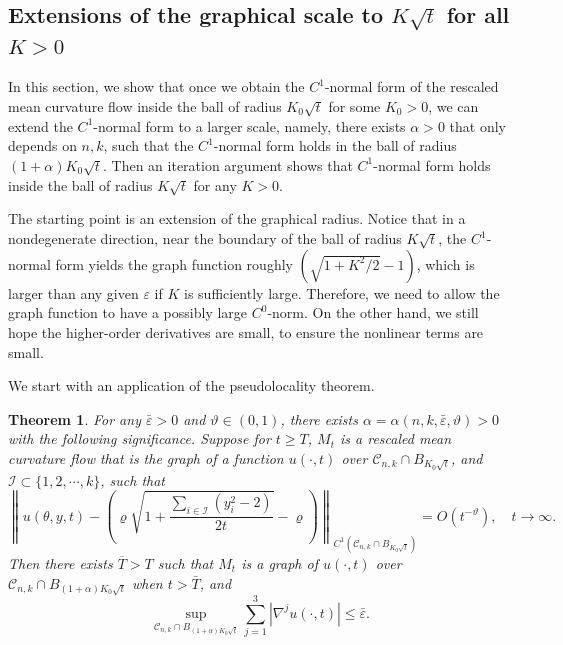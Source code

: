 \documentclass[11pt]{amsart}
\numberwithin{equation}{section}
\newtheorem{theorem}{Theorem}[section]
\numberwithin{equation}{section}
\newcommand{\eps}{\varepsilon}
\newcommand{\cC}{\mathcal{C}}
\begin{document}
	
	\subsection{Extensions of the graphical scale to $K\sqrt{t}$ for all $K>0$}
	In this section, we show that once we obtain the $C^1$-normal form of the rescaled mean curvature flow inside the ball of radius $K_0\sqrt{t}$ for some $K_0>0$, we can extend the $C^1$-normal form to a larger scale, namely, there exists $\alpha>0$ that only depends on $n,k$, such that the $C^1$-normal form holds in the ball of radius $(1+\alpha)K_0\sqrt{t}$. Then an iteration argument shows that $C^1$-normal form holds inside the ball of radius $K\sqrt{t}$ for any $K>0$.
	
	
	
	The starting point is an extension of the graphical radius. Notice that in a nondegenerate direction, near the boundary of the ball of radius $K\sqrt{t}$, the $C^1$-normal form yields the graph function roughly $(\sqrt{1+K^2/2}-1)$, which is larger than any given $\eps$ if $K$ is sufficiently large. Therefore, we need to allow the graph function to have a possibly large $C^0$-norm. On the other hand, we still hope the higher-order derivatives are small, to ensure the nonlinear terms are small.
	
	We start with an application of the pseudolocality theorem.
	
	\begin{theorem}\label{thm:K0sqrt t to K sqrt t}
		For any $\bar \eps>0$ and $\vartheta\in(0,1)$, there exists $\alpha=\alpha(n,k,\bar \eps,\vartheta)>0$ with the following significance. Suppose for $t\geq T$, $M_t$ is a rescaled mean curvature flow that is the graph of a function $u(\cdot,t)$ over $ \cC_{n,k}\cap B_{K_0\sqrt{t}}$, and $\mathcal I\subset\{1,2,\cdots,k\}$, such that 
		\[
		\left\| u(\theta,y,t)-\left(\varrho\sqrt{1+\frac{\sum_{i\in\mathcal I}(y_i^2-2)}{2t}}-\varrho\right)
		\right\|_{C^1(\cC_{n,k}\cap B_{K_0\sqrt{t}})}=O(t^{-\vartheta}),\quad
		t\to\infty.
		\]
		Then there exists $\overline{T}>T$ such that $M_t$ is a graph of $u(\cdot,t)$ over $ \cC_{n,k}\cap B_{(1+\alpha)K_0\sqrt{t}}$ when $t>\bar T$, and 
		\begin{equation}\label{eq:Du and D2u bound}
			\sup_{ \cC_{n,k}\cap B_{(1+\alpha)K_0\sqrt{t}}}
			\sum_{j=1}^3|\nabla^j u(\cdot,t)|\leq \bar\eps.
		\end{equation}
	\end{theorem}
	
\end{document}
